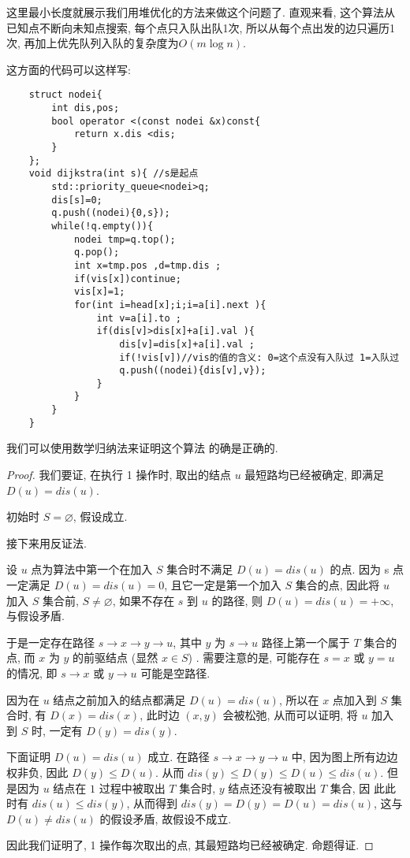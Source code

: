 这里最小长度就展示我们用堆优化的方法来做这个问题了. 直观来看, 这个算法从已知点不断向未知点搜索, 
每个点只入队出队1次, 所以从每个点出发的边只遍历1次, 再加上优先队列入队的复杂度为$O(m\log n)$. 

这方面的代码可以这样写: 

\begin{lstlisting}
    struct nodei{
        int dis,pos;
        bool operator <(const nodei &x)const{
            return x.dis <dis;
        }
    };
    void dijkstra(int s){ //s是起点
        std::priority_queue<nodei>q;
        dis[s]=0;
        q.push((nodei){0,s});
        while(!q.empty()){
            nodei tmp=q.top();
            q.pop();
            int x=tmp.pos ,d=tmp.dis ;
            if(vis[x])continue;
            vis[x]=1;
            for(int i=head[x];i;i=a[i].next ){
                int v=a[i].to ;
                if(dis[v]>dis[x]+a[i].val ){
                    dis[v]=dis[x]+a[i].val ;
                    if(!vis[v])//vis的值的含义: 0=这个点没有入队过 1=入队过
                    q.push((nodei){dis[v],v});
                }
            }
        }
    }    
\end{lstlisting}


我们可以使用数学归纳法来证明这个算法
的确是正确的. 

\begin{proof}
    我们要证, 在执行 1 操作时, 取出的结点 $u$ 最短路均已经被确定, 即满足 $D(u) = dis(u)$. 

初始时 $S = \varnothing$, 假设成立. 

接下来用反证法. 

设 $u$ 点为算法中第一个在加入 $S$ 集合时不满足 $D(u) = dis(u)$ 的点. 
因为 s 点一定满足 $D(u)=dis(u)=0$, 
且它一定是第一个加入 $S$ 集合的点, 因此将 $u$ 加入 $S$ 集合前, $S \neq \varnothing$, 
如果不存在 $s$ 到 $u$ 的路径, 则 $D(u) = dis(u) = +\infty$, 与假设矛盾. 

于是一定存在路径 $s \to x \to y \to u$, 其中 $y$ 为 $s \to u$ 路径上第一个属于 $T$
集合的点, 而 $x$ 为 $y$ 的前驱结点 (显然 $x \in S$) . 需要注意的是, 可能存在 $s = x$ 或 
$y = u$ 的情况, 即 $s \to x$ 或 $y \to u$ 可能是空路径. 

因为在 $u$ 结点之前加入的结点都满足 $D(u) = dis(u)$, 所以在 $x$ 点加入到 $S$ 集合时, 
有 $D(x) = dis(x)$, 此时边 $(x,y)$ 会被松弛, 从而可以证明, 
将 $u$ 加入到 $S$ 时, 一定有 $D(y)=dis(y)$. 

下面证明 $D(u) = dis(u)$ 成立. 在路径 $s \to x \to y \to u$ 中, 
因为图上所有边边权非负, 因此 $D(y) \leq D(u)$. 从而 $dis(y) \leq D(y) \leq D(u)\leq dis(u)$. 
但是因为 $u$ 结点在 $1$ 过程中被取出 $T$ 集合时, $y$ 结点还没有被取出 $T$ 集合, 因
此此时有 $dis(u)\leq dis(y)$, 从而得到 $dis(y) = D(y) = D(u) = dis(u)$, 这与 
$D(u)\neq dis(u)$ 的假设矛盾, 故假设不成立. 

因此我们证明了, 1 操作每次取出的点, 其最短路均已经被确定. 命题得证. 
\end{proof}

